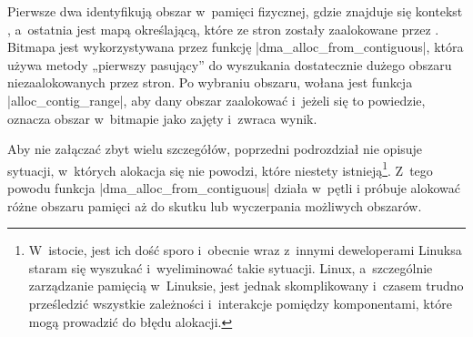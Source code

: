 Pierwsze dwa identyfikują obszar w~pamięci fizycznej, gdzie znajduje
się kontekst , a~ostatnia jest mapą określającą, które ze stron
zostały zaalokowane przez .  Bitmapa jest wykorzystywana przez
funkcję \code|dma_alloc_from_contiguous|, która używa metody „pierwszy
pasujący” do wyszukania dostatecznie dużego obszaru niezaalokowanych
przez  stron.  Po wybraniu obszaru, wołana jest funkcja
\code|alloc_contig_range|, aby dany obszar zaalokować i~jeżeli się to
powiedzie, oznacza obszar w~bitmapie jako zajęty i~zwraca wynik.

Aby nie załączać zbyt wielu szczegółów, poprzedni podrozdział nie
opisuje sytuacji, w~których alokacja się nie powodzi, które niestety
istnieją\footnote{W~istocie, jest ich dość sporo i~obecnie wraz
  z~innymi deweloperami Linuksa staram się wyszukać i~wyeliminować
  takie sytuacji.  Linux, a~szczególnie zarządzanie pamięcią
  w~Linuksie, jest jednak skomplikowany i~czasem trudno prześledzić
  wszystkie zależności i~interakcje pomiędzy komponentami, które mogą
  prowadzić do błędu alokacji.}.  Z~tego powodu funkcja
\code|dma_alloc_from_contiguous| działa w~pętli i próbuje alokować
różne obszaru pamięci aż do skutku lub wyczerpania możliwych obszarów.
